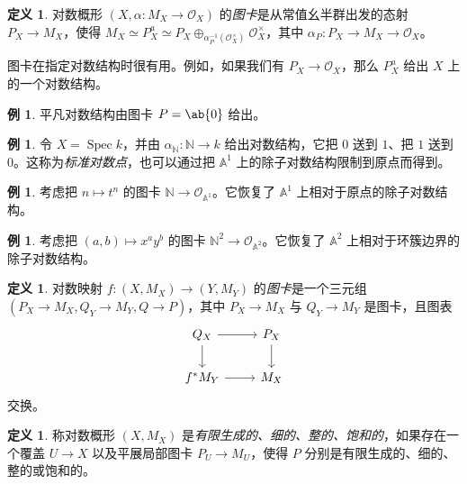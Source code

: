 \documentclass{amsart}
\theoremstyle{definition}
\newtheorem{defn}[thm]{定义}
\newtheorem{exm}[thm]{例}
\theoremstyle{remark}
\theoremstyle{plain}
\theoremstyle{definition}
\theoremstyle{remark}
\newcommand{\A}{\mathbb{A}}
\newcommand{\N}{\mathbb{N}}
\newcommand{\mc}[1]{\mathcal{#1}}
\newcommand{\1}{\mathbf{1}}
\newcommand{\2}{\mathbf{2}}
\newcommand{\3}{\mathbf{3}}
\DeclareMathOperator{\Spec}{Spec}
\begin{document}
\begin{defn}
    对数概形 \((X, \alpha \colon M_X \to \mc{O}_X)\) 的\textit{图卡}是从常值幺半群出发的态射 \(P_X \to M_X\)，使得 \(M_X \simeq P_X^a \simeq P_X \oplus_{\alpha_P^{-1}(\mc{O}_X^{\times})} \mc{O}_X^{\times}\)，其中 \(\alpha_P \colon P_X \to M_X \to \mc{O}_X\)。
\end{defn}

图卡在指定对数结构时很有用。例如，如果我们有 \(P_X \to \mc{O}_X\)，那么 \(P_X^a\) 给出 \(X\) 上的一个对数结构。

\begin{exm}
    平凡对数结构由图卡 \(P = \ab\{0\}\) 给出。
\end{exm}

\begin{exm}
    令 \(X = \Spec k\)，并由 \(\alpha_{\N} \colon \N \to k\) 给出对数结构，它把 \(0\) 送到 \(1\)、把 \(1\) 送到 \(0\)。这称为\textit{标准对数点}，也可以通过把 \(\A^1\) 上的除子对数结构限制到原点而得到。
\end{exm}

\begin{exm}
    考虑把 \(n \mapsto t^n\) 的图卡 \(\N \to \mc{O}_{\A^1}\)。它恢复了 \(\A^1\) 上相对于原点的除子对数结构。
\end{exm}

\begin{exm}
    考虑把 \((a,b) \mapsto x^a y^b\) 的图卡 \(\N^2 \to \mc{O}_{\A^2}\)。它恢复了 \(\A^2\) 上相对于环簇边界的除子对数结构。
\end{exm}

\begin{defn}
    对数映射 \(f \colon (X, M_X) \to (Y, M_Y)\) 的\textit{图卡}是一个三元组 \((P_X\to M_X, Q_Y \to M_Y, Q \to P)\)，其中 \(P_X \to M_X\) 与 \(Q_Y \to M_Y\) 是图卡，且图表
    \begin{equation*}
    \begin{tikzcd}
        Q_X \ar{r} \ar{d} & P_X \ar{d} \\
        f^* M_Y \ar{r} & M_X
    \end{tikzcd}
    \end{equation*}
    交换。
\end{defn}

\begin{defn}
    称对数概形 \((X, M_X)\) 是\textit{有限生成的、细的、整的、饱和的}，如果存在一个覆盖 \(U \to X\) 以及平展局部图卡 \(P_U \to M_U\)，使得 \(P\) 分别是有限生成的、细的、整的或饱和的。
\end{defn}
\end{document}

